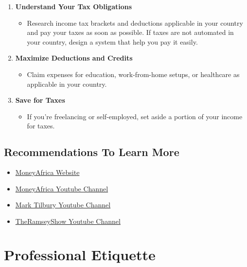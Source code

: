 \documentclass[
  letterpaper,
  DIV=11,
  numbers=noendperiod]{scrreprt}
\providecommand{\tightlist}{%
  \setlength{\itemsep}{0pt}\setlength{\parskip}{0pt}}\usepackage{longtable,booktabs,array}
\begin{document}
\begin{enumerate}
\def\labelenumi{\arabic{enumi}.}
\item
  \textbf{Understand Your Tax Obligations}

  \begin{itemize}
  \tightlist
  \item
    Research income tax brackets and deductions applicable in your
    country and pay your taxes as soon as possible. If taxes are not
    automated in your country, design a system that help you pay it
    easily.
  \end{itemize}
\item
  \textbf{Maximize Deductions and Credits}

  \begin{itemize}
  \tightlist
  \item
    Claim expenses for education, work-from-home setups, or healthcare
    as applicable in your country.
  \end{itemize}
\item
  \textbf{Save for Taxes}

  \begin{itemize}
  \tightlist
  \item
    If you're freelancing or self-employed, set aside a portion of your
    income for taxes.
  \end{itemize}
\end{enumerate}

\section{Recommendations To Learn
More}\label{recommendations-to-learn-more-2}

\begin{itemize}
\tightlist
\item
  \href{https://themoneyafrica.com/}{MoneyAfrica Website}
\item
  \href{https://www.youtube.com/@moneyafrica}{MoneyAfrica Youtube
  Channel}
\item
  \href{https://www.youtube.com/@marktilbury}{Mark Tilbury Youtube
  Channel}
\item
  \href{https://www.youtube.com/@TheRamseyShow}{TheRamseyShow Youtube
  Channel}
\end{itemize}


\chapter{Professional Etiquette}\label{professional-etiquette}
\end{document}

